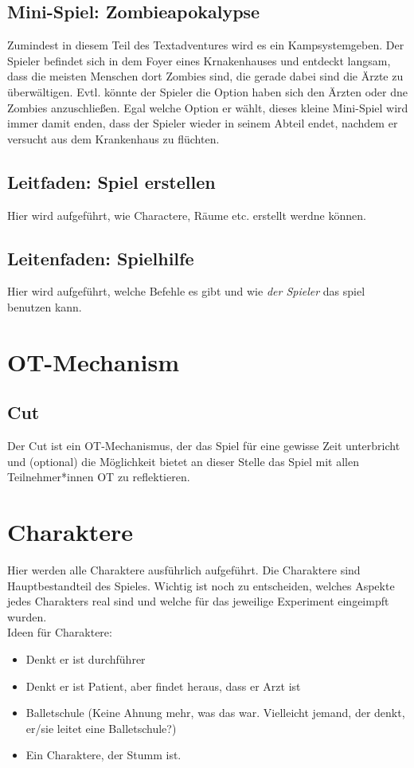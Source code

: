 \documentclass[a4paper, 12pt]{scrartcl}
\begin{document}
    \subsection{Mini-Spiel: Zombieapokalypse} \label{zombieapokalypse}
    Zumindest in diesem Teil des Textadventures wird es ein Kampsystemgeben. 
    Der Spieler befindet sich in dem Foyer eines Krnakenhauses und entdeckt langsam, dass die meisten Menschen dort Zombies sind, die gerade dabei sind die Ärzte zu überwältigen. 
    Evtl. könnte der Spieler die Option haben sich den Ärzten oder dne Zombies anzuschließen.
    Egal welche Option er wählt, dieses kleine Mini-Spiel wird immer damit enden, dass der Spieler wieder in seinem Abteil endet, nachdem er versucht aus dem Krankenhaus zu flüchten.
    
    \subsection{Leitfaden: Spiel erstellen}
    Hier wird aufgeführt, wie Charactere, Räume etc. erstellt werdne können.
    
    \subsection{Leitenfaden: Spielhilfe}
    Hier wird aufgeführt, welche Befehle es gibt und wie \textit{der Spieler} das spiel benutzen kann.
    

    \section{OT-Mechanism}
    \subsection{Cut} \label{cut}
    Der Cut ist ein OT-Mechanismus, der das Spiel für eine gewisse Zeit unterbricht und (optional) die Möglichkeit bietet an dieser Stelle das Spiel mit allen Teilnehmer*innen OT zu reflektieren. 

    \section{Charaktere}
    Hier werden alle Charaktere ausführlich aufgeführt. Die Charaktere sind Hauptbestandteil des Spieles. Wichtig ist noch zu entscheiden, welches Aspekte jedes Charakters \glqq real\grqq{} sind und welche für das jeweilige Experiment \glqq eingeimpft\grqq{} wurden.\\
    Ideen für Charaktere:
    \begin{itemize}
    \item Denkt er ist durchführer
    \item Denkt er ist Patient, aber findet heraus, dass er Arzt ist
    \item Balletschule (Keine Ahnung mehr, was das war. Vielleicht jemand, der denkt, er/sie leitet eine Balletschule?)
    \item Ein Charaktere, der Stumm ist.
    \end{itemize}
\end{document}
